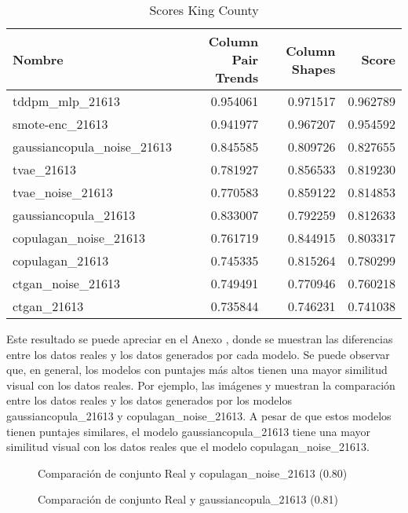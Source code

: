 \begin{table}[H]
    \centering
    \caption{Scores King County}
    \label{kingcounty-scores}
    \begin{tabular}{|l|r|r|r|}
        \hline
        \rowcolor[gray]{0.8}
        Nombre                      & Column Pair Trends & Column Shapes & \textbf{Score} \\ \hline
        tddpm\_mlp\_21613           & 0.954061 & 0.971517 & 0.962789 \\ \hline
        smote-enc\_21613            & 0.941977 & 0.967207 & 0.954592 \\ \hline
        gaussiancopula\_noise\_21613& 0.845585 & 0.809726 & 0.827655 \\ \hline
        tvae\_21613                 & 0.781927 & 0.856533 & 0.819230 \\ \hline
        tvae\_noise\_21613          & 0.770583 & 0.859122 & 0.814853 \\ \hline
        gaussiancopula\_21613       & 0.833007 & 0.792259 & 0.812633 \\ \hline
        copulagan\_noise\_21613     & 0.761719 & 0.844915 & 0.803317 \\ \hline
        copulagan\_21613            & 0.745335 & 0.815264 & 0.780299 \\ \hline
        ctgan\_noise\_21613         & 0.749491 & 0.770946 & 0.760218 \\ \hline
        ctgan\_21613                & 0.735844 & 0.746231 & 0.741038 \\ \hline
    \end{tabular}
\end{table}
\newpage

Este resultado se puede apreciar en el Anexo , donde se muestran las diferencias entre los datos reales y los datos generados por cada modelo. Se puede observar que, en general, los modelos con puntajes más altos tienen una mayor similitud visual con los datos reales. Por ejemplo, las imágenes  y  muestran la comparación entre los datos reales y los datos generados por los modelos gaussiancopula\_21613 y copulagan\_noise\_21613. A pesar de que estos modelos tienen puntajes similares, el modelo gaussiancopula\_21613 tiene una mayor similitud visual con los datos reales que el modelo copulagan\_noise\_21613.

\begin{figure}[H]
    \centering
	
	\caption{Comparación de conjunto Real y copulagan\_noise\_21613 (0.80)}
	\label{r-pair-copulagan_noise_21613}
\end{figure}
\begin{figure}[H]
    \centering
	
	\caption{Comparación de conjunto Real y gaussiancopula\_21613 (0.81)}
	\label{r-pair-gaussiancopula_21613}
\end{figure}


